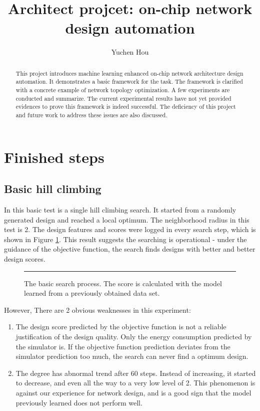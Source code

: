 \documentclass[12pt]{article}
\theoremstyle{definition}
\begin{document}
\title{Architect projcet: on-chip network design automation}
\author{Yuchen Hou}
\maketitle

\begin{abstract}
  This project introduces machine learning enhanced on-chip network architecture design automation. It demonstrates a basic framework for the task. The framework is clarified with a concrete example of network topology optimization. A few experiments are conducted and summarize. The current experimental results have not yet provided evidences to prove this framework is indeed successful. The deficiency of this project and future work to address these issues are also discussed.
\end{abstract}

\section{Finished steps}
\subsection{Basic hill climbing}
In this basic test is a single hill climbing search. It started from a randomly generated design and reached a local optimum. The neighborhood radius in this test is 2. The design features and scores were logged in every search step, which is shown in Figure \ref{fig:trace}. This result suggests the searching is operational - under the guidance of the objective function, the search finds designs with better and better design scores.
\begin{figure}[htb]
    \centering
    \begin{subfigure}
      {\texttt{[image: trace-2014-12-18-14-48-05.png]}}
    \end{subfigure}
    \rule{\linewidth}{1pt}
    \caption{The basic search process. The score is calculated with the model learned from a previously obtained data set.}
    \label{fig:trace}
\end{figure}
However, There are 2 obvious weaknesses in this experiment:
\begin{enumerate}
  \item The design score predicted by the objective function is not a reliable justification of the design quality. Only the energy consumption predicted by the simulator is. If the objective function prediction deviates from the simulator prediction too much, the search can never find a optimum design.
  \item The degree has abnormal trend after 60 steps. Instead of increasing, it started to decrease, and even all the way to a very low level of 2. This phenomenon is against our experience for network design, and is a good sign that the model previously learned does not perform well.
\end{enumerate}
\end{document}
